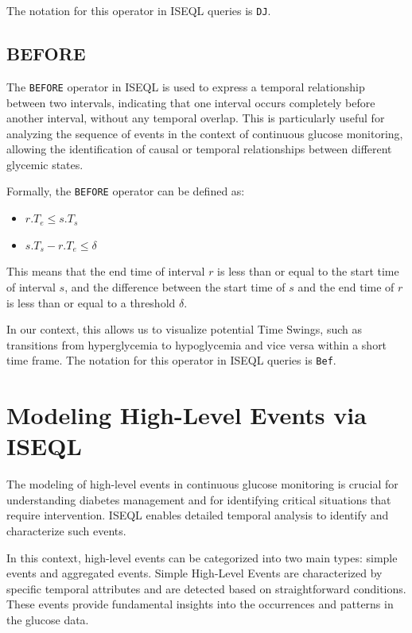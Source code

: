 \documentclass{article}
\begin{document}
The notation for this operator in ISEQL queries is \texttt{DJ}.


\subsection{BEFORE}

The \texttt{BEFORE} operator in ISEQL is used to express a temporal relationship between two intervals, indicating that one interval occurs completely before another interval, without any temporal overlap. This is particularly useful for analyzing the sequence of events in the context of continuous glucose monitoring, allowing the identification of causal or temporal relationships between different glycemic states.

Formally, the \texttt{BEFORE} operator can be defined as:
\begin{itemize}
    \item $r.T_e \le s.T_s$
    \item $s.T_s - r.T_e \le \delta$
\end{itemize}

This means that the end time of interval $r$ is less than or equal to the start time of interval $s$, and the difference between the start time of $s$ and the end time of $r$ is less than or equal to a threshold $\delta$. 

In our context, this allows us to visualize potential Time Swings, such as transitions from hyperglycemia to hypoglycemia and vice versa within a short time frame. The notation for this operator in ISEQL queries is \texttt{Bef}.


\section{Modeling High-Level Events via ISEQL}

The modeling of high-level events in continuous glucose monitoring is crucial for understanding diabetes management and for identifying critical situations that require intervention. ISEQL enables detailed temporal analysis to identify and characterize such events. 

In this context, high-level events can be categorized into two main types: simple events and aggregated events. Simple High-Level Events are characterized by specific temporal attributes and are detected based on straightforward conditions. These events provide fundamental insights into the occurrences and patterns in the glucose data.
\end{document}
